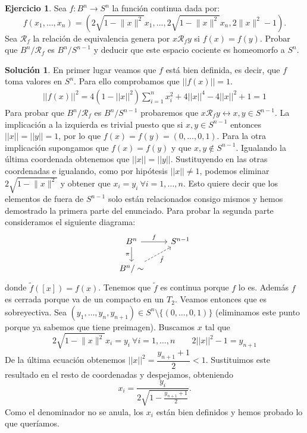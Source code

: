 \documentclass{article}
\theoremstyle{plain}
\theoremstyle{definition}
\newtheorem{exercise}{Ejercicio}
\newtheorem*{sol*}{Solución}
\providecommand{\norm}[1]{\lVert#1\rVert}
\begin{document}
\newpage
\begin{exercise} Sea $f : B^n \to S^n$ la función continua dada por:
\[ f(x_1,\dots,x_n) = (2 \sqrt{1-\norm{x}^2}x_1, \dots, 2 \sqrt{1-\norm{x}^2}x_n, 2 \norm{x}^2-1). \]
Sea $\mathcal{R}_f$ la relación de equivalencia genera por $x \mathcal{R}_f y$ si $f(x) = f(y)$. Probar que $B ^n/\mathcal{R}_f$ es $B^n/S^{n-1}$ y deducir que este espacio cociente es homeomorfo a $S^n$.
\end{exercise}
\begin{sol*}
En primer lugar veamos que $f$ está bien definida, es decir, que $f$ toma valores en $S^n$. Para ello comprobamos que $||f(x)||=1$.
\begin{gather*}
||f(x)||^2=4(1-||x||^2)\sum_{i=1}^n x_i^2 +4||x||^4-4||x||^2+1=1
\end{gather*}
Para probar que $B ^n/\mathcal{R}_f$ es $B^n/S^{n-1}$ probaremos que $x \mathcal{R}_f y\leftrightarrow x,y\in S^{n-1}$. La implicación a la izquierda es trivial puesto que si $x,y\in S^{n-1}$ entonces $||x||=||y||=1$, por lo que $f(x)=f(y)=(0,\dots,0,1)$. Para la otra implicación supongamos que $f(x)=f(y)$ y que $x,y\not\in S^{n-1}$. Igualando la última coordenada obtenemos que $||x||=||y||$. Sustituyendo en las otras coordenadas e igualando, como por hipótesis $||x||\neq 1$, podemos eliminar $2\sqrt{1-\norm{x}^2}$ y obtener que $x_i=y_i\ \forall i=1,\dots, n$. Esto quiere decir que los elementos de fuera de $S^{n-1}$ solo están relacionados consigo mismos y hemos demostrado la primera parte del enunciado.
Para probar la segunda parte consideramos el siguiente diagrama:
\[
\begin{tikzcd}
B^n\arrow[r,"f"]\arrow[d,"\pi"'] & S^{n-1}\\
B^n/\sim \arrow[ur, "\tilde{f}"',dashed]
\end{tikzcd}
\]
donde $\tilde{f}([x])=f(x)$. Tenemos que $\tilde{f}$ es continua porque $f$ lo es. Además $f$ es cerrada porque va de un compacto en un $T_2$. Veamos entonces que es sobreyectiva. Sea $(y_1,\dots,y_n, y_{n+1})\in S^n\setminus\{(0,\dots,0,1)\}$ (eliminamos este punto porque ya sabemos que tiene preimagen). Buscamos $x$ tal que 
\[2\sqrt{1-\norm{x}^2}x_i=y_i\ \forall i=1,\dots, n\qquad 2||x||^2-1=y_{n+1}\]
De la última ecuación obtenemos $||x||^2=\dfrac{y_{n+1}+1}{2}<1$. Sustituimos este resultado en el resto de coordenadas y despejamos, obteniendo
\[x_i=\frac{y_i}{2\sqrt{1-\frac{y_{n+1}+1}{2}}}.\]
Como el denominador no se anula, los $x_i$ están bien definidos y hemos probado lo que queríamos.
\end{sol*}
\end{document}
